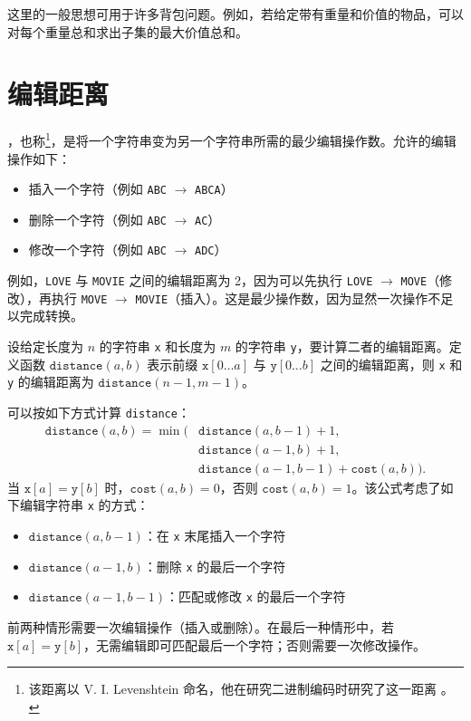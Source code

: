 这里的一般思想可用于许多背包问题。例如，若给定带有重量和价值的物品，可以对每个重量总和求出子集的最大价值总和。

\section{编辑距离}


，也称\footnote{该距离以 V. I. Levenshtein 命名，他在研究二进制编码时研究了这一距离 \cite{lev66}。}，是将一个字符串变为另一个字符串所需的最少编辑操作数。允许的编辑操作如下：
\begin{itemize}
\item 插入一个字符（例如 \texttt{ABC} $\rightarrow$ \texttt{ABCA}）
\item 删除一个字符（例如 \texttt{ABC} $\rightarrow$ \texttt{AC}）
\item 修改一个字符（例如 \texttt{ABC} $\rightarrow$ \texttt{ADC}）
\end{itemize}

例如，\texttt{LOVE} 与 \texttt{MOVIE} 之间的编辑距离为 2，因为可以先执行 \texttt{LOVE} $\rightarrow$ \texttt{MOVE}（修改），再执行 \texttt{MOVE} $\rightarrow$ \texttt{MOVIE}（插入）。这是最少操作数，因为显然一次操作不足以完成转换。

设给定长度为 $n$ 的字符串 \texttt{x} 和长度为 $m$ 的字符串 \texttt{y}，要计算二者的编辑距离。定义函数 $\texttt{distance}(a,b)$ 表示前缀 $\texttt{x}[0\ldots a]$ 与 $\texttt{y}[0\ldots b]$ 之间的编辑距离，则 \texttt{x} 和 \texttt{y} 的编辑距离为 $\texttt{distance}(n-1,m-1)$。

可以按如下方式计算 \texttt{distance}：
\begin{equation*}
\begin{split}
\texttt{distance}(a,b) = \min(& \texttt{distance}(a,b-1)+1, \\
                           & \texttt{distance}(a-1,b)+1, \\
                           & \texttt{distance}(a-1,b-1)+\texttt{cost}(a,b)).
\end{split}
\end{equation*}
当 $\texttt{x}[a]=\texttt{y}[b]$ 时，$\texttt{cost}(a,b)=0$，否则 $\texttt{cost}(a,b)=1$。该公式考虑了如下编辑字符串 \texttt{x} 的方式：
\begin{itemize}
\item $\texttt{distance}(a,b-1)$：在 \texttt{x} 末尾插入一个字符
\item $\texttt{distance}(a-1,b)$：删除 \texttt{x} 的最后一个字符
\item $\texttt{distance}(a-1,b-1)$：匹配或修改 \texttt{x} 的最后一个字符
\end{itemize}
前两种情形需要一次编辑操作（插入或删除）。在最后一种情形中，若 $\texttt{x}[a]=\texttt{y}[b]$，无需编辑即可匹配最后一个字符；否则需要一次修改操作。

